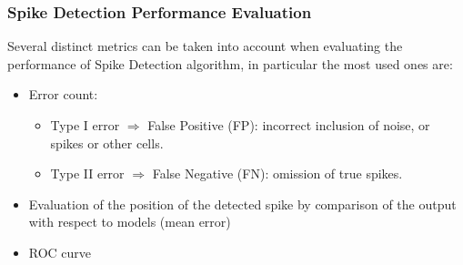 \subsubsection{Spike Detection Performance Evaluation}
Several distinct metrics can be taken into account when evaluating the performance of Spike Detection algorithm, in particular the most used ones are:
\begin{itemize}
    \item Error count:
          \begin{itemize}
              \item Type I error \(\Rightarrow\) False Positive (FP): incorrect
                    inclusion of noise, or spikes or other cells.
              \item Type II error \(\Rightarrow\) False Negative (FN): omission of
                    true spikes.
          \end{itemize}
    \item Evaluation of the position of the detected spike by comparison of the output with respect to models (mean error)
    \item ROC curve
\end{itemize}
